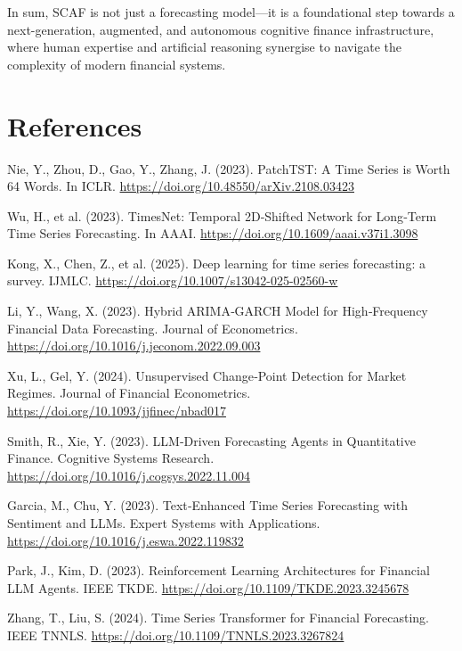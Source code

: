 \documentclass[conference]{IEEEtran}
\begin{document}
In sum, SCAF is not just a forecasting model—it is a foundational step towards a next-generation, augmented, and autonomous cognitive finance infrastructure, where human expertise and artificial reasoning synergise to navigate the complexity of modern financial systems.

\section{References}
%
\begin{thebibliography}{99}

 Nie, Y., Zhou, D., Gao, Y., Zhang, J. (2023). PatchTST: A Time Series is Worth 64 Words. In ICLR. \url{https://doi.org/10.48550/arXiv.2108.03423}

 Wu, H., et al. (2023). TimesNet: Temporal 2D‑Shifted Network for Long‑Term Time Series Forecasting. In AAAI. \url{https://doi.org/10.1609/aaai.v37i1.3098}

 Kong, X., Chen, Z., et al. (2025). Deep learning for time series forecasting: a survey. IJMLC. \url{https://doi.org/10.1007/s13042-025-02560-w}

 Li, Y., Wang, X. (2023). Hybrid ARIMA‑GARCH Model for High‑Frequency Financial Data Forecasting. Journal of Econometrics. \url{https://doi.org/10.1016/j.jeconom.2022.09.003}

 Xu, L., Gel, Y. (2024). Unsupervised Change‑Point Detection for Market Regimes. Journal of Financial Econometrics. \url{https://doi.org/10.1093/jjfinec/nbad017}

 Smith, R., Xie, Y. (2023). LLM‑Driven Forecasting Agents in Quantitative Finance. Cognitive Systems Research. \url{https://doi.org/10.1016/j.cogsys.2022.11.004}

 Garcia, M., Chu, Y. (2023). Text‑Enhanced Time Series Forecasting with Sentiment and LLMs. Expert Systems with Applications. \url{https://doi.org/10.1016/j.eswa.2022.119832}

 Park, J., Kim, D. (2023). Reinforcement Learning Architectures for Financial LLM Agents. IEEE TKDE. \url{https://doi.org/10.1109/TKDE.2023.3245678}

 Zhang, T., Liu, S. (2024). Time Series Transformer for Financial Forecasting. IEEE TNNLS. \url{https://doi.org/10.1109/TNNLS.2023.3267824}


\end{thebibliography}
\end{document}

